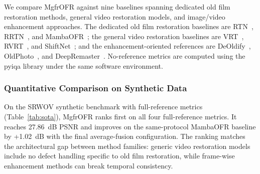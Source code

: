 \documentclass[symmetry,article,submit,pdftex,moreauthors]{Definitions/mdpi}
\begin{document}
We compare MgfrOFR against nine baselines spanning dedicated old film restoration methods, general video restoration models, and image/video enhancement approaches. The dedicated old film restoration baselines are RTN~\cite{wan2022rtn}, RRTN~\cite{lin2024rrtn}, and MambaOFR~\cite{mao2025mambaofr}; the general video restoration baselines are VRT~\cite{liang2024vrt}, RVRT~\cite{liang2022rvrt}, and ShiftNet~\cite{li2023shiftnet}; and the enhancement-oriented references are DeOldify~\cite{jantic2019deoldify}, OldPhoto~\cite{wan2023oldphotopami}, and DeepRemaster~\cite{iizuka2019deepremaster}. No-reference metrics are computed using the pyiqa library under the same software environment.

\subsubsection{Quantitative Comparison on Synthetic Data}

On the SRWOV synthetic benchmark with full-reference metrics (Table~\ref{tab:sota}), MgfrOFR ranks first on all four full-reference metrics. It reaches 27.86~dB PSNR and improves on the same-protocol MambaOFR baseline by +1.02~dB with the final average-fusion configuration. The ranking matches the architectural gap between method families: generic video restoration models include no defect handling specific to old film restoration, while frame-wise enhancement methods can break temporal consistency.
\end{document}

